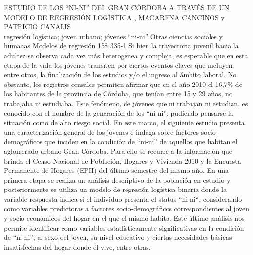 \A
{ESTUDIO DE LOS “NI-NI” DEL GRAN CÓRDOBA A TRAVÉS DE UN MODELO DE REGRESIÓN LOGÍSTICA}
{, MACARENA CANCINOS y PATRICIO CANALIS}
{
\\}
{regresión logística; joven urbano; jóvenes “ni-ni”} 
 {Otras ciencias sociales y humanas} 
 {Modelos de regresión} 
 {158} 
 {335-1}
{Si bien la trayectoria juvenil hacia la adultez se observa cada vez más heterogénea y compleja, es esperable que en esta etapa de la vida los jóvenes transiten por ciertos eventos claves que incluyen, entre otros, la finalización de los estudios y/o el ingreso al ámbito laboral. No obstante, los registros censales permiten afirmar que en el año 2010 el 16,7\% de los habitantes de la provincia de Córdoba, que tenían entre 15 y 29 años, no trabajaba ni estudiaba. Este fenómeno, de jóvenes que ni trabajan ni estudian, es conocido con el nombre de la generación de los “ni-ni”, pudiendo pensarse la situación como de alto riesgo social. En este marco, el siguiente estudio presenta una caracterización general de los jóvenes e indaga sobre factores socio-demográficos que inciden en la condición de “ni-ni” de aquellos que habitan el aglomerado urbano Gran Córdoba. Para ello se recurre a la información que brinda el Censo Nacional de Población, Hogares y Vivienda 2010 y la Encuesta Permanente de Hogares (EPH) del último semestre del mismo año. En una primera etapa se realiza un análisis descriptivo de la población en estudio y posteriormente se utiliza un modelo de regresión logística binaria donde la variable respuesta indica si el individuo presenta el status “ni-ni“, considerando como variables predictoras a factores socio-demográficos correspondientes al joven y socio-económicos del hogar en el que el mismo habita. Este último análisis nos permite identificar como variables estadísticamente significativas en la condición de “ni-ni”, al sexo del joven, su nivel educativo y ciertas necesidades básicas insatisfechas del hogar donde él vive, entre otras. }
